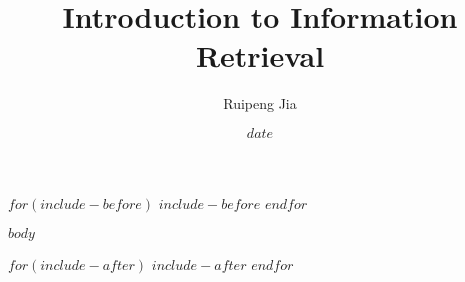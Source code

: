 \documentclass{article}
\title{Introduction to Information Retrieval}    \let\Title\@title
\author{Ruipeng Jia}                             \let\Author\@author
\date{$date$}
\begin{document}
\maketitle
$for(include-before)$  %
$include-before$
$endfor$

$body$

$for(include-after)$
$include-after$
$endfor$
\end{document}
